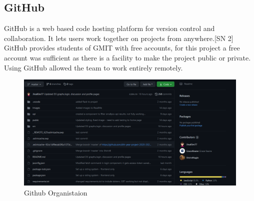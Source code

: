 \subsection{GitHub}
GitHub is a web based code hosting platform for version control and collaboration. It lets users work together on projects from anywhere.[SN 2]
GitHub provides students of GMIT with free accounts, for this project a free account was sufficient as there is a facility to make the project public or private. Using GitHub allowed the team to work entirely remotely.
\begin{figure}
    \centering
    \includegraphics[scale=0.5]{img/github.PNG}
    \caption{Github Organistaion}
    \label{fig:my_label1}
\end{figure}





